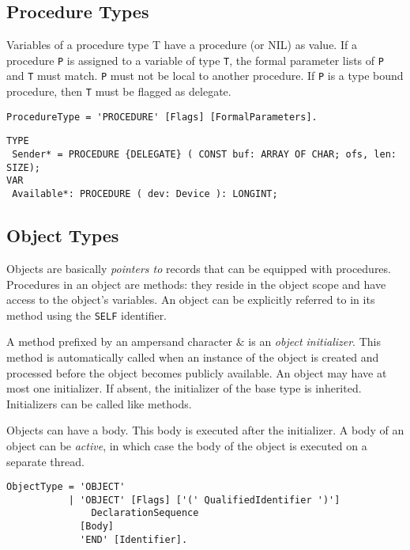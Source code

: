 \documentclass[a4wide,11pt]{article}
\begin{document}
\subsection{Procedure Types}

Variables of a procedure type T have a procedure (or NIL) as value.
If a procedure \verb"P" is assigned to a variable of type \verb"T", the formal parameter lists of \verb"P" and \verb"T" must match. \verb"P" must not be local to another procedure.
If \verb"P" is a type bound procedure, then \verb"T" must be flagged as delegate.

\begin{lstlisting}[style=ebnf]
ProcedureType = 'PROCEDURE' [Flags] [FormalParameters].
\end{lstlisting}

\begin{lstlisting}[style=example]
TYPE
 Sender* = PROCEDURE {DELEGATE} ( CONST buf: ARRAY OF CHAR; ofs, len: SIZE);
VAR
 Available*: PROCEDURE ( dev: Device ): LONGINT;
\end{lstlisting}

\subsection{Object Types}

Objects are basically \emph{pointers to} records that can be equipped with procedures.
Procedures in an object are methods: they reside in the object scope and have access to the object's variables.
An object can be explicitly referred to in its method using the \lstinline"SELF" identifier.

A method prefixed by an ampersand character $\&$ is an \emph{object initializer}.
This method is automatically called when an instance of the object is created and processed before the object becomes publicly available.
An object may have at most one initializer.
If absent, the initializer of the base type is inherited.
Initializers can be called like methods.

Objects can have a body.
This body is executed after the initializer.
A body of an object can be \emph{active}, in which case the body of the object is executed on a separate thread.

\begin{lstlisting}[style=ebnf]
ObjectType = 'OBJECT'
           | 'OBJECT' [Flags] ['(' QualifiedIdentifier ')']
               DeclarationSequence
             [Body]
             'END' [Identifier].
\end{lstlisting}
\end{document}
